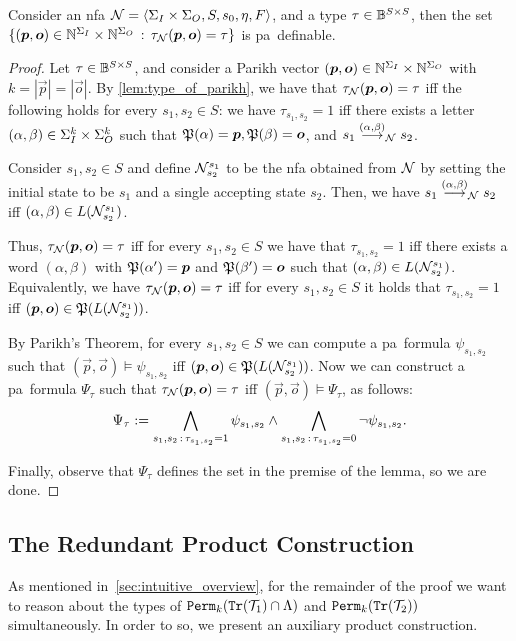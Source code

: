 \begin{lemma}
	\label{lem:parikh_type_definable}
	Consider an \gls{nfa} $\mathcal{N}=\left< \Sigma_{I}\times \Sigma_{O},S,s_0,\eta,F\right>$, and a type $\tau\in \mathbb{B}^{S\times S}$, then the set $\{(\boldsymbol{p},\boldsymbol{o})\in \mathbb{N}^{\Sigma_{I}} \times \mathbb{N}^{\Sigma_{O}}\, :\, \tau_{\mathcal{N}}(\boldsymbol{p},\boldsymbol{o})=\tau\}$ is \gls{pa}~definable.
\end{lemma}
\begin{proof}
	Let $\tau\in \mathbb{B}^{S\times S}$, and consider a Parikh vector $(\boldsymbol{p},\boldsymbol{o})\in \mathbb{N}^{\Sigma_{I}} \times \mathbb{N}^{\Sigma_{O}}$ with $k=|\vec{p}|=|\vec{o}|$. By \autoref{lem:type_of_parikh}, we have that $\tau_{\mathcal{N}}(\boldsymbol{p},\boldsymbol{o})=\tau$ iff the following holds for every $s_1,s_2\in S$: we have $\tau_{s_1,s_2}=1$ iff 
	there exists a letter $(\alpha,\beta)\in \Sigma_{I}^k\times \Sigma_{O}^k$ such that $\mathfrak{P}(\alpha)=\boldsymbol{p},\mathfrak{P}(\beta)=\boldsymbol{o}$, and $s_1\stackrel{(\alpha,\beta)}{\longrightarrow}_{\mathcal{N}} s_2$.

	Consider $s_1,s_2\in S$ and define $\mathcal{N}^{s_1}_{s_2}$ to be the \gls{nfa} obtained from $\mathcal{N}$ by setting the initial state to be $s_1$ and a single accepting state $s_2$.
	Then, we have $s_1\stackrel{(\alpha,\beta)}{\longrightarrow}_{\mathcal{N}} s_2$ iff $(\alpha,\beta)\in L(\mathcal{N}^{s_1}_{s_2})$. 
	
	Thus, $\tau_{\mathcal{N}}(\boldsymbol{p},\boldsymbol{o})=\tau$ iff for every $s_1,s_2\in S$ we have that $\tau_{s_1,s_2}=1$ iff there exists a word $(\alpha,\beta)$ with $\mathfrak{P}(\alpha')=\boldsymbol{p}$ and $\mathfrak{P}(\beta')=\boldsymbol{o}$ such that $(\alpha,\beta)\in L(\mathcal{N}^{s_1}_{s_2})$.
	Equivalently, we have $\tau_{\mathcal{N}}(\boldsymbol{p},\boldsymbol{o})=\tau$ iff for every $s_1,s_2\in S$ it holds that $\tau_{s_1,s_2}=1$ iff $(\boldsymbol{p},\boldsymbol{o})\in \mathfrak{P}(L(\mathcal{N}^{s_1}_{s_2}))$.
	
	By Parikh's Theorem, for every $s_1,s_2\in S$ we can compute a \gls{pa}~formula $\psi_{s_1,s_2}$ such that $(\vec{p},\vec{o})\models \psi_{s_1,s_2}$ iff $(\boldsymbol{p},\boldsymbol{o})\in \mathfrak{P}(L(\mathcal{N}^{s_1}_{s_2}))$. Now we can construct a \gls{pa}~formula $\Psi_{\tau}$ such that $\tau_{\mathcal{N}}(\boldsymbol{p},\boldsymbol{o})=\tau$ iff $(\vec{p},\vec{o})\models \Psi_\tau$, as follows:
	\[\Psi_\tau:= \bigwedge_{s_1,s_2\, :\, \tau_{s_1,s_2}=1} \psi_{s_1,s_2}\wedge \bigwedge_{s_1,s_2\, :\, \tau_{s_1,s_2}=0}\neg \psi_{s_1,s_2}.\]
	
	Finally, observe that $\Psi_\tau$ defines the set in the premise of the lemma, so we are done.
\end{proof}

\subsection*{The Redundant Product Construction}
As mentioned in~\autoref{sec:intuitive_overview}, for the remainder of the proof we want to reason about the types of ${\mathtt{Perm}}_k({\mathtt{Tr}}(\mathcal{T}_1)\cap \Lambda)$ and ${\mathtt{Perm}}_k({\mathtt{Tr}}(\mathcal{T}_2))$ simultaneously. In order to so, we present an auxiliary product construction.

